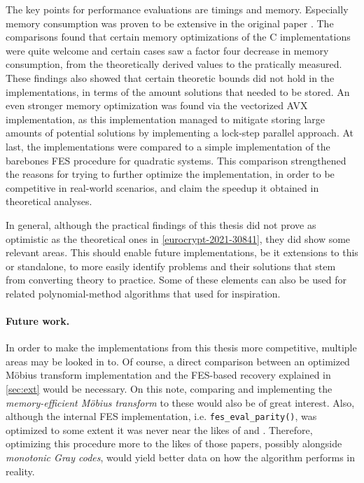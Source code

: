 The key points for performance evaluations are timings and memory. Especially memory consumption was proven to be extensive in the original paper \cite{eurocrypt-2021-30841}. The comparisons found that certain memory optimizations of the C implementations were quite welcome and certain cases saw a factor four decrease in memory consumption, from the theoretically derived values to the pratically measured. These findings also showed that certain theoretic bounds did not hold in the implementations, in terms of the amount solutions that needed to be stored. An even stronger memory optimization was found via the vectorized AVX implementation, as this implementation managed to mitigate storing large amounts of potential solutions by implementing a lock-step parallel approach. At last, the implementations were compared to a simple implementation of the barebones FES procedure for quadratic systems. This comparison strengthened the reasons for trying to further optimize the implementation, in order to be competitive in real-world scenarios, and claim the speedup it obtained in theoretical analyses. 

In general, although the practical findings of this thesis did not prove as optimistic as the theoretical ones in \cref{eurocrypt-2021-30841}, they did show some relevant areas. This should enable future implementations, be it extensions to this or standalone, to more easily identify problems and their solutions that stem from converting theory to practice. Some of these elements can also be used for related polynomial-method algorithms that \cite{eurocrypt-2021-30841} used for inspiration.

\paragraph{Future work.} In order to make the implementations from this thesis more competitive, multiple areas may be looked in to. Of course, a direct comparison between an optimized Möbius transform implementation and the FES-based recovery explained in \cref{sec:ext} would be necessary. On this note, comparing and implementing the \textit{memory-efficient Möbius transform} to these would also be of great interest. Also, although the internal FES implementation, i.e. \texttt{fes\_eval\_parity()}, was optimized to some extent it was never near the likes of \cite{ches-2010-23990} and \cite{cryptoeprint:2013/436}. Therefore, optimizing this procedure more to the likes of those papers, possibly alongside \textit{monotonic Gray codes}, would yield better data on how the algorithm performs in reality.


